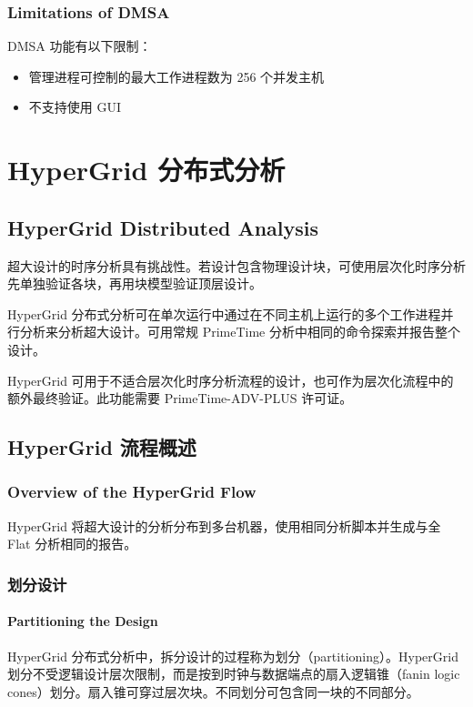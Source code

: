 \subsubsection*{Limitations of DMSA}

DMSA 功能有以下限制：
\begin{itemize}
  \item 管理进程可控制的最大工作进程数为 256 个并发主机
  \item 不支持使用 GUI
\end{itemize}


\section{HyperGrid 分布式分析}
\subsection*{HyperGrid Distributed Analysis}

超大设计的时序分析具有挑战性。若设计包含物理设计块，可使用层次化时序分析先单独验证各块，再用块模型验证顶层设计。

HyperGrid 分布式分析可在单次运行中通过在不同主机上运行的多个工作进程并行分析来分析超大设计。可用常规 PrimeTime 分析中相同的命令探索并报告整个设计。

HyperGrid 可用于不适合层次化时序分析流程的设计，也可作为层次化流程中的额外最终验证。此功能需要 PrimeTime-ADV-PLUS 许可证。

\subsection{HyperGrid 流程概述}
\subsubsection*{Overview of the HyperGrid Flow}

HyperGrid 将超大设计的分析分布到多台机器，使用相同分析脚本并生成与全 Flat 分析相同的报告。

\subsubsection{划分设计}
\paragraph*{Partitioning the Design}

HyperGrid 分布式分析中，拆分设计的过程称为划分（partitioning）。HyperGrid 划分不受逻辑设计层次限制，而是按到时钟与数据端点的扇入逻辑锥（fanin logic cones）划分。扇入锥可穿过层次块。不同划分可包含同一块的不同部分。


